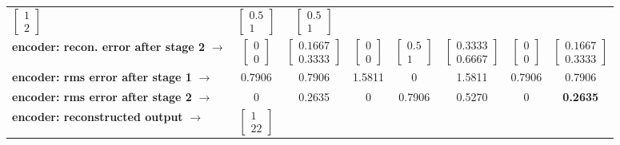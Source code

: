 \begin{table}[t]
\begin{tabular}{|l||c|c|c|c|c|c|c|}
$\left[\begin{array}{c}1 \\2\end{array}\right]$   					&  
$\left[\begin{array}{c}0.5 \\1\end{array}\right]$     				& 
$\left[\begin{array}{c}0.5 \\1\end{array}\right]$ 				\\
\textbf{encoder: recon. error after stage 2} $\rightarrow$ 		& 
$\left[\begin{array}{c}0 \\0\end{array}\right]$     				&  
$\left[\begin{array}{c}0.1667 \\0.3333\end{array}\right]$		&  
$\left[\begin{array}{c}0 \\0\end{array}\right]$   					&  
$\left[\begin{array}{c}0.5 \\1\end{array}\right]$   				&  
$\left[\begin{array}{c}0.3333 \\0.6667\end{array}\right]$   		&  
$\left[\begin{array}{c}0 \\0\end{array}\right]$     				& 
$\left[\begin{array}{c}0.1667 \\0.3333\end{array}\right]$ 		\\
\hline
\textbf{encoder: rms error after stage 1} $\rightarrow$ 		&\color{blue}0.7906    &\color{blue}0.7906   &\color{blue}1.5811   	&\color{blue}0   &\color{blue}1.5811   &\color{blue}0.7906     	&\color{blue}0.7906 \\
\textbf{encoder: rms error after stage 2} $\rightarrow$ 		&\color{darkgreen}0    &\color{darkgreen}0.2635 	   &\color{darkgreen}0   &\color{darkgreen}0.7906   	&\color{darkgreen}0.5270   &\color{darkgreen}0     		&{\textbf{\color{darkgreen}0.2635}} \\
\hline
\textbf{encoder: reconstructed output} $\rightarrow$          		& 
$\left[\begin{array}{c}1 \\22\end{array}\right]$     				&  

\end{tabular}
\end{table}
